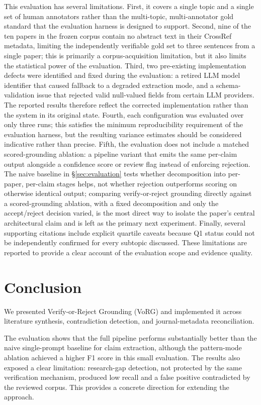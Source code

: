 \documentclass[11pt]{article}
\begin{document}
This evaluation has several limitations. First, it covers a single topic and a single set of human annotators rather than the multi-topic, multi-annotator gold standard that the evaluation harness is designed to support. Second, nine of the ten papers in the frozen corpus contain no abstract text in their CrossRef metadata, limiting the independently verifiable gold set to three sentences from a single paper; this is primarily a corpus-acquisition limitation, but it also limits the statistical power of the evaluation. Third, two pre-existing implementation defects were identified and fixed during the evaluation: a retired LLM model identifier that caused fallback to a degraded extraction mode, and a schema-validation issue that rejected valid null-valued fields from certain LLM providers. The reported results therefore reflect the corrected implementation rather than the system in its original state. Fourth, each configuration was evaluated over only three runs; this satisfies the minimum reproducibility requirement of the evaluation harness, but the resulting variance estimates should be considered indicative rather than precise. Fifth, the evaluation does not include a matched scored-grounding ablation: a pipeline variant that emits the same per-claim output alongside a confidence score or review flag instead of enforcing rejection. The naive baseline in \S\ref{sec:evaluation} tests whether decomposition into per-paper, per-claim stages helps, not whether rejection outperforms scoring on otherwise identical output; comparing verify-or-reject grounding directly against a scored-grounding ablation, with a fixed decomposition and only the accept/reject decision varied, is the most direct way to isolate the paper's central architectural claim and is left as the primary next experiment. Finally, several supporting citations include explicit quartile caveats because Q1 status could not be independently confirmed for every subtopic discussed. These limitations are reported to provide a clear account of the evaluation scope and evidence quality.

\section{Conclusion}

We presented Verify-or-Reject Grounding (VoRG) and implemented it across literature synthesis, contradiction detection, and journal-metadata reconciliation.

The evaluation shows that the full pipeline performs substantially better than the naive single-prompt baseline for claim extraction, although the pattern-mode ablation achieved a higher F1 score in this small evaluation. The results also exposed a clear limitation: research-gap detection, not protected by the same verification mechanism, produced low recall and a false positive contradicted by the reviewed corpus. This provides a concrete direction for extending the approach.
\end{document}
